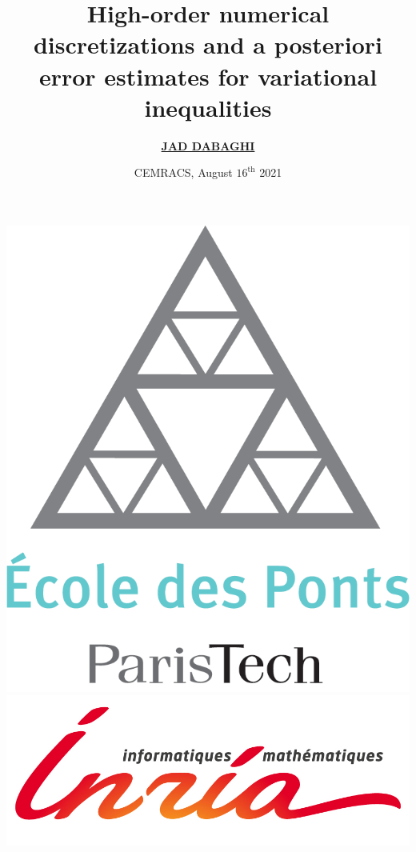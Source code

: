 \documentclass[aspectratio=169]{beamer}
\title{High-order numerical
discretizations and a posteriori error estimates for variational inequalities}
\author{\underline{\textbf{JAD DABAGHI}}}
\institute[]{\'{E}cole des Ponts Paristech (CERMICS) \& INRIA Matherials}
\date{CEMRACS, August $16^{\mathrm{th}}$ 2021}
\begin{document}



\begin{frame}
\maketitle
\includegraphics[scale=0.09]{Logo_ponts_paristech}
\hfill 
\includegraphics[scale=0.3]{inria}

\end{frame}


\end{document}
